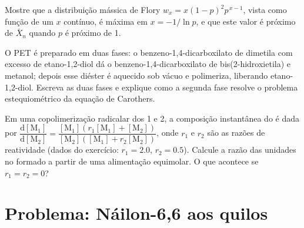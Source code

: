 \begin{exercise}[$\star\star\star$]\label{exo:b2:polymer-synthesis:10}
Mostre que a distribuição mássica de Flory $w_x = x(1-p)^2p^{\,x-1}$, vista como função de um $x$
contínuo, é máxima em $x = -1/\ln p$, e que este valor é próximo de $\bar X_n$ quando $p$ é próximo de 1.
\end{exercise}

\begin{exercise}[$\star\star\star$]\label{exo:b2:polymer-synthesis:11}
O PET é preparado em duas fases: o benzeno-1,4-dicarboxilato de dimetila com excesso de etano-1,2-diol
dá o benzeno-1,4-dicarboxilato de bis(2-hidroxietila) e metanol; depois esse diéster é aquecido sob
vácuo e polimeriza, liberando etano-1,2-diol. Escreva as duas fases e explique como a segunda fase
resolve o problema estequiométrico da equação de Carothers.
\end{exercise}

\begin{exercise}[$\star\star\star$]\label{exo:b2:polymer-synthesis:12}
Em uma copolimerização radicalar dos  1 e 2, a composição instantânea do  é
dada por $\dfrac{\mathrm d[\mathrm M_1]}{\mathrm d[\mathrm M_2]} = \dfrac{[\mathrm M_1](r_1[\mathrm M_1]
+ [\mathrm M_2])}{[\mathrm M_2]([\mathrm M_1] + r_2[\mathrm M_2])}$, onde $r_1$ e $r_2$ são as
razões de reatividade (dados do exercício: $r_1 = 2.0$, $r_2 = 0.5$). Calcule a razão das unidades no
 formado a partir de uma alimentação equimolar. O que acontece se $r_1 = r_2 = 0$?
\end{exercise}

\section{Problema: Náilon-6,6 aos quilos}

